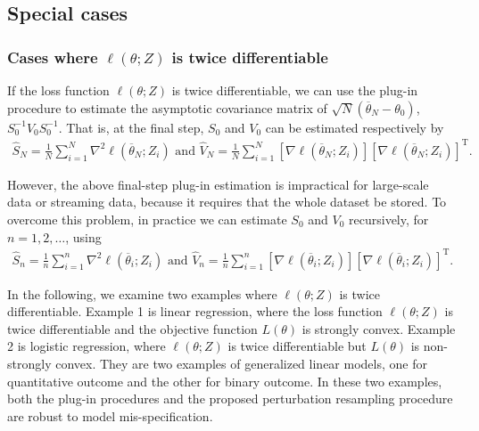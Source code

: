 \documentclass[twoside,11pt]{article}
\def\trans{^{ \mathrm{\scriptscriptstyle T} }}
\def\wh{\widehat}
\def\ol{\overline}
\begin{document}
\subsection{Special cases}

\subsubsection{Cases where $\ell(\theta; Z)$ is twice differentiable}

If the loss function $\ell(\theta; Z)$ is twice differentiable, we can use the plug-in procedure to estimate the asymptotic covariance matrix of $\sqrt{N}(\ol{\theta}_N-\theta_0)$, $S_0^{-1}V_0S_0^{-1}$. That is, at the final step, $S_0$ and $V_0$ can be estimated respectively by
\begin{eqnarray}
\wh{S}_N=\frac{1}{N}\sum_{i=1}^N \nabla^2 \ell(\ol{\theta}_N; Z_i) \mbox{\ \  and \ } \wh{V}_N=\frac{1}{N}\sum_{i=1}^N [\nabla \ell(\ol{\theta}_N; Z_i)][\nabla \ell(\ol{\theta}_N; Z_i)]\trans. \label{plug-in-N}
\end{eqnarray}

However, the above final-step plug-in estimation is impractical for large-scale data or streaming data, because it requires that the whole dataset be stored. To overcome this problem, in practice we can estimate $S_0$ and $V_0$ recursively, for $n=1, 2, \dots$, using
\begin{eqnarray}
\wh{S}_n=\frac{1}{n}\sum_{i=1}^n \nabla^2 \ell(\ol{\theta}_i; Z_i) \mbox{\ \  and \ } \wh{V}_n = \frac{1}{n}\sum_{i=1}^n [\nabla \ell(\ol{\theta}_i; Z_i)][\nabla \ell(\ol{\theta}_i; Z_i)]\trans. \label{plug-in-R}
\end{eqnarray}

In the following, we examine two examples where $\ell(\theta; Z)$ is twice differentiable. Example 1 is linear regression, where the loss function $\ell(\theta; Z)$ is twice differentiable and the objective function $L(\theta)$ is strongly convex. Example 2 is logistic regression, where $\ell(\theta; Z)$ is twice differentiable but $L(\theta)$ is non-strongly convex. They are two examples of generalized linear models, one for quantitative outcome and the other for binary outcome. In these two examples, both the plug-in procedures and the proposed perturbation resampling procedure are robust to model mis-specification.
\end{document}
